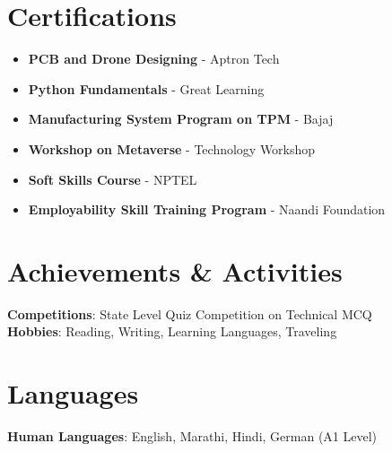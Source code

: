 \documentclass[letterpaper,11pt]{article}
\begin{document}
\section{Certifications}
    \begin{itemize}
        \item \textbf{PCB and Drone Designing} - Aptron Tech
        \item \textbf{Python Fundamentals} - Great Learning
        \item \textbf{Manufacturing System Program on TPM} - Bajaj
        \item \textbf{Workshop on Metaverse} - Technology Workshop
        \item \textbf{Soft Skills Course} - NPTEL
        \item \textbf{Employability Skill Training Program} - Naandi Foundation
    \end{itemize}


\section{Achievements \& Activities}
 \begin{itemize}[leftmargin=0.15in, label={}]
    \large{\item{
     \textbf{Competitions}{: State Level Quiz Competition on Technical MCQ} \\
     \textbf{Hobbies}{: Reading, Writing, Learning Languages, Traveling} \\
    }}
 \end{itemize}


\section{Languages}
 \begin{itemize}[leftmargin=0.15in, label={}]
    \large{\item{
     \textbf{Human Languages}{: English, Marathi, Hindi, German (A1 Level)} \\
    }}
 \end{itemize}

\end{document}
